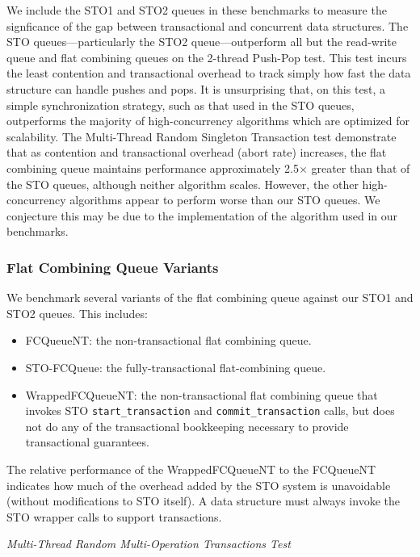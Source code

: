We include the STO1 and STO2 queues in these benchmarks to measure the signficance of the gap between transactional and concurrent data structures. The STO queues---particularly the STO2 queue---outperform all but the read-write queue and flat combining queues on the 2-thread Push-Pop test. This test incurs the least contention and transactional overhead to track simply how fast the data structure can handle pushes and pops. It is unsurprising that, on this test, a simple synchronization strategy, such as that used in the STO queues, outperforms the majority of high-concurrency algorithms which are optimized for scalability. The Multi-Thread Random Singleton Transaction test demonstrate that as contention and transactional overhead (abort rate) increases, the flat combining queue maintains performance approximately 2.5$\times$ greater than that of the STO queues, although neither algorithm scales. However, the other high-concurrency algorithms appear to perform worse than our STO queues. We conjecture this may be due to the implementation of the algorithm used in our benchmarks\cite{libcds}.

\subsubsection{Flat Combining Queue Variants}

We benchmark several variants of the flat combining queue against our STO1 and STO2 queues. This includes:
\begin{itemize}
    \item FCQueueNT: the non-transactional flat combining queue.
    \item STO-FCQueue: the fully-transactional flat-combining queue.
    \item WrappedFCQueueNT: the non-transactional flat combining queue that invokes STO \texttt{start\_transaction} and \texttt{commit\_transaction} calls, but does not do any of the transactional bookkeeping necessary to provide transactional guarantees.
\end{itemize}

The relative performance of the WrappedFCQueueNT to the FCQueueNT indicates how much of the overhead added by the STO system is unavoidable (without modifications to STO itself). A data structure must always invoke the STO wrapper calls to support transactions. 

\iffalse
\emph{2-Thread Push-Pop Test}
\begin{figure}[ht!]
\centering
\texttt{[image: fcqueues/Q:PushPop.png]}
\caption{Performance of Various Flat-Combining Queue Algorithms}
\label{fig:fcqueues_queues}
\end{figure}

\emph{Multi-Thread Random Singleton Transactions Test}
\begin{figure}[ht!]
\centering
\texttt{[image: fcqueues/Q:RandSingleOps10000.png]}
\texttt{[image: fcqueues/Q:RandSingleOps50000.png]}
\texttt{[image: fcqueues/Q:RandSingleOps100000.png]}
\caption{Performance of Various Flat-Combining Queue Algorithms}
\label{fig:txnal_queues}
\end{figure}
\fi
\emph{Multi-Thread Random Multi-Operation Transactions Test}

